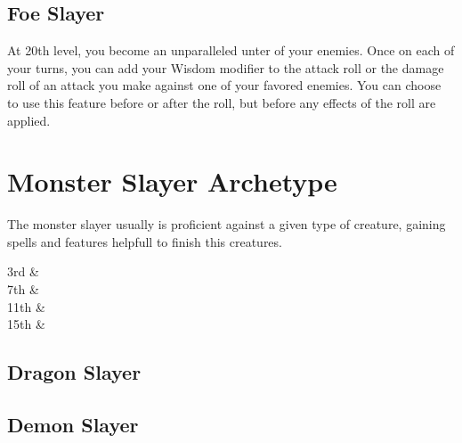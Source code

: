 \documentclass[11pt,a4paper,twocolumn]{article}
\begin{document}
	\subsection*{Foe Slayer}
	At 20th level, you become an unparalleled unter of your enemies. Once on each of your turns, you can add your Wisdom modifier to the attack roll or the damage roll of an attack you make against one of your favored enemies. You can choose to use this feature before or after the roll, but before any effects of the roll are	applied.
	
	\section*{Monster Slayer Archetype}
	The monster slayer usually is proficient against a given type of creature, gaining spells and features helpfull to finish this creatures.
	
	
	
	\begin{archetypespells}
		3rd & \textit{} \\
		7th & \textit{} \\
		11th & \textit{}\\
		15th & \textit{}\\
	\end{archetypespells}
	\subsection*{Dragon Slayer}
	\subsection*{Demon Slayer}
\end{document}
